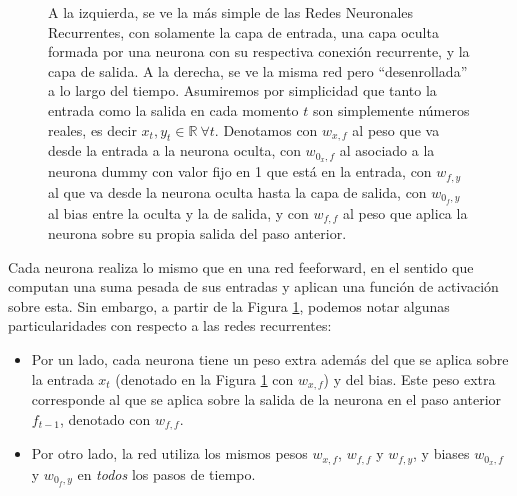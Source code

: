 \documentclass[../../main.tex]{subfiles}
\begin{document}
\begin{figure}[ht]
    \caption{A la izquierda, se ve la más simple de las Redes Neuronales Recurrentes, con
    solamente la capa de entrada, una capa oculta formada por una neurona con su
    respectiva conexión recurrente, y la capa de salida. A la derecha, se ve la misma red
    pero ``desenrollada'' a lo largo del tiempo. Asumiremos por simplicidad que tanto la
    entrada como la salida en cada momento \(t\) son simplemente números reales, es decir
    \(x_t, y_t \in \mathbb{R} \ \forall t\). Denotamos con \(w_{x,f}\) al peso que va
    desde la entrada a la neurona oculta, con \(w_{0_x,f}\) al asociado a la neurona dummy
    con valor fijo en 1 que está en la entrada, con \(w_{f,y}\) al que va desde la neurona
    oculta hasta la capa de salida, con \(w_{0_f, y}\) al bias entre la oculta y la de
    salida, y con \(w_{f,f}\) al peso que aplica la neurona sobre su propia salida del paso
    anterior.}
    \label{fig:simple-rnn}
\end{figure}

Cada neurona realiza lo mismo que en una red feeforward, en el sentido que computan una
suma pesada de sus entradas y aplican una función de activación sobre esta. Sin embargo, a
partir de la Figura \ref{fig:simple-rnn}, podemos notar algunas particularidades con
respecto a las redes recurrentes:
\begin{itemize}
    \item Por un lado, cada neurona tiene un peso extra además del que se aplica sobre la
    entrada \(x_t\) (denotado en la Figura \ref{fig:simple-rnn} con \(w_{x,f}\)) y del
    bias. Este peso extra corresponde al que se aplica sobre la salida de la neurona en el
    paso anterior \(f_{t-1}\), denotado con \(w_{f,f}\).
    \item Por otro lado, la red utiliza los mismos pesos \(w_{x,f}\), \(w_{f,f}\) y
    \(w_{f,y}\), y biases \(w_{0_x,f}\) y \(w_{0_f, y}\) en \textit{todos} los pasos de
    tiempo.
\end{itemize}
\end{document}
